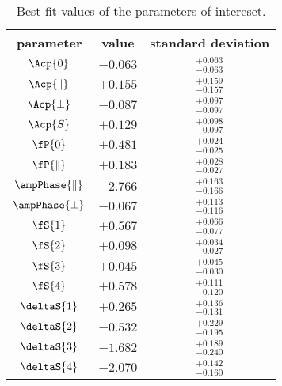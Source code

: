 \begin{table}[!h]
  \center
  \begin{tabular}{c c c}
    \hline
     parameter & value & standard deviation  \\
     \hline
     $             \Acp{0}$ & $-0.063$ & ${}^{+0.063}_{-0.063}$ \\
     $     \Acp{\parallel}$ & $+0.155$ & ${}^{+0.159}_{-0.157}$ \\
     $         \Acp{\perp}$ & $-0.087$ & ${}^{+0.097}_{-0.097}$ \\
     $             \Acp{S}$ & $+0.129$ & ${}^{+0.098}_{-0.097}$ \\
     \hline
     $              \fP{0}$ & $+0.481$ & ${}^{+0.024}_{-0.025}$ \\
     $      \fP{\parallel}$ & $+0.183$ & ${}^{+0.028}_{-0.027}$ \\
     $\ampPhase{\parallel}$ & $-2.766$ & ${}^{+0.163}_{-0.166}$ \\
     $    \ampPhase{\perp}$ & $-0.067$ & ${}^{+0.113}_{-0.116}$ \\
     \hline
     $              \fS{1}$ & $+0.567$ & ${}^{+0.066}_{-0.077}$ \\
     $              \fS{2}$ & $+0.098$ & ${}^{+0.034}_{-0.027}$ \\
     $              \fS{3}$ & $+0.045$ & ${}^{+0.045}_{-0.030}$ \\
     $              \fS{4}$ & $+0.578$ & ${}^{+0.111}_{-0.120}$ \\
     $          \deltaS{1}$ & $+0.265$ & ${}^{+0.136}_{-0.131}$ \\
     $          \deltaS{2}$ & $-0.532$ & ${}^{+0.229}_{-0.195}$ \\
     $          \deltaS{3}$ & $-1.682$ & ${}^{+0.189}_{-0.240}$ \\
     $          \deltaS{4}$ & $-2.070$ & ${}^{+0.142}_{-0.160}$ \\
    \hline
  \end{tabular}
  \caption{\small Best fit values of the parameters of intereset.}
  \label{bestFitResult}
\end{table}



